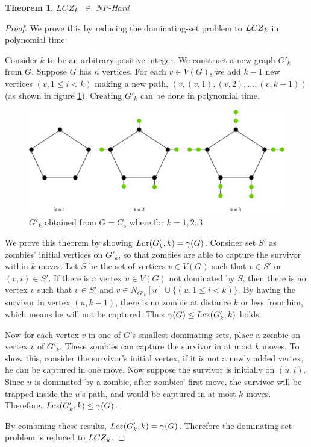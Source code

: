 \documentclass[1p]{elsarticle}
\newtheorem{theorem}{Theorem}
\newcommand{\NPZ}{\ooalign{$Z$\cr\hfil\rule[.8ex]{.3em}{.09ex}\hfil\cr}}
\newcommand{\zn}{\ooalign{$z$\cr\hfil\rule[.5ex]{.2em}{.08ex}\hfil\cr}}
\begin{document}
	\begin{theorem}
		$LC\NPZ_k$ $\in$ NP-Hard
	\end{theorem}
	\begin{proof}
		We prove this by reducing the dominating-set problem to $LC\NPZ_k$ in polynomial time.

		Consider $k$ to be an arbitrary positive integer. We construct a new graph $G'_k$ from $G$. Suppose $G$ has $n$
		vertices. For each $v \in V(G)$, we add $k-1$ new vertices $(v,1 \leq i < k)$ making a new path,
		$(v,(v,1),(v,2),...,(v,k-1))$ (as shown in figure \ref{fig:p7}). Creating $G'_k$ can be done in polynomial time.

		\begin{figure}[h!]
			\centering
			\includegraphics[width=0.9\linewidth]{fig/LCZ.png}
			\caption{$G'_k$ obtained from $G = C_5$ where for $k = 1,2,3$}
			\label{fig:p7}
		\end{figure}		


		We prove this theorem by showing $Lc\zn(G'_k,k) = \gamma(G)$. Consider set $S'$ as zombies' initial vertices on $G'_k$,
		so that zombies are able to capture the survivor within $k$ moves. Let $S$ be the set of vertices $v \in V(G)$
		such that $v \in S'$ or $(v,i) \in S'$. If there is a vertex $u \in V(G)$ not dominated by $S$, then there is no
		vertex $v$ such that $v \in S'$ and $v \in N_{G'_k}[u] \cup \{(u,1 \leq i < k)\}$. By having the survivor in
		vertex $(u, k-1)$, there is no zombie at distance $k$ or less from him, which means he will not be captured.
		Thus $\gamma(G) \leq Lc\zn(G'_k,k)$ holds.
		
		Now for each vertex $v$ in one of $G$'s smallest dominating-sets, place a zombie on vertex $v$ of $G'_k$. These
		zombies can capture the survivor in at most $k$ moves. To show this, consider the survivor's initial vertex, if it
		is not a newly added vertex, he can be captured in one move. Now suppose the survivor is initially on $(u,i)$. Since
		$u$ is dominated by a zombie, after zombies' first move, the survivor will be trapped inside the $u$'s path, and would
		be captured in at most $k$ moves. Therefore, $Lc\zn(G'_k,k) \leq \gamma(G)$.

		By combining these results, $Lc\zn(G'_k,k) = \gamma(G)$. Therefore the dominating-set problem is reduced to
		$LC\NPZ_k$.

	\end{proof}
\end{document}
